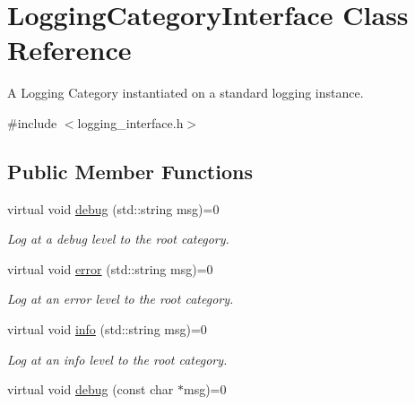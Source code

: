 \hypertarget{classLoggingCategoryInterface}{}\section{Logging\+Category\+Interface Class Reference}
\label{classLoggingCategoryInterface}


A Logging Category instantiated on a standard logging instance.  




{\ttfamily \#include $<$logging\+\_\+interface.\+h$>$}

\subsection*{Public Member Functions}
\begin{DoxyCompactItemize}
\item 
virtual void \hyperlink{classLoggingCategoryInterface_aca90c0a8380658a3918ee4c6eb60314b}{debug} (std\+::string msg)=0\hypertarget{classLoggingCategoryInterface_aca90c0a8380658a3918ee4c6eb60314b}{}\label{classLoggingCategoryInterface_aca90c0a8380658a3918ee4c6eb60314b}

\begin{DoxyCompactList}\small\item\em Log at a debug level to the root category. \end{DoxyCompactList}\item 
virtual void \hyperlink{classLoggingCategoryInterface_a377b5248cd5f1c67dc7f13250bf56d78}{error} (std\+::string msg)=0\hypertarget{classLoggingCategoryInterface_a377b5248cd5f1c67dc7f13250bf56d78}{}\label{classLoggingCategoryInterface_a377b5248cd5f1c67dc7f13250bf56d78}

\begin{DoxyCompactList}\small\item\em Log at an error level to the root category. \end{DoxyCompactList}\item 
virtual void \hyperlink{classLoggingCategoryInterface_a2a8bf026f9aeaea95f443744292e237b}{info} (std\+::string msg)=0\hypertarget{classLoggingCategoryInterface_a2a8bf026f9aeaea95f443744292e237b}{}\label{classLoggingCategoryInterface_a2a8bf026f9aeaea95f443744292e237b}

\begin{DoxyCompactList}\small\item\em Log at an info level to the root category. \end{DoxyCompactList}\item 
virtual void \hyperlink{classLoggingCategoryInterface_a6633ea62fbd9850de9f95c42bcb98209}{debug} (const char $\ast$msg)=0\hypertarget{classLoggingCategoryInterface_a6633ea62fbd9850de9f95c42bcb98209}{}\label{classLoggingCategoryInterface_a6633ea62fbd9850de9f95c42bcb98209}


\end{DoxyCompactItemize}
